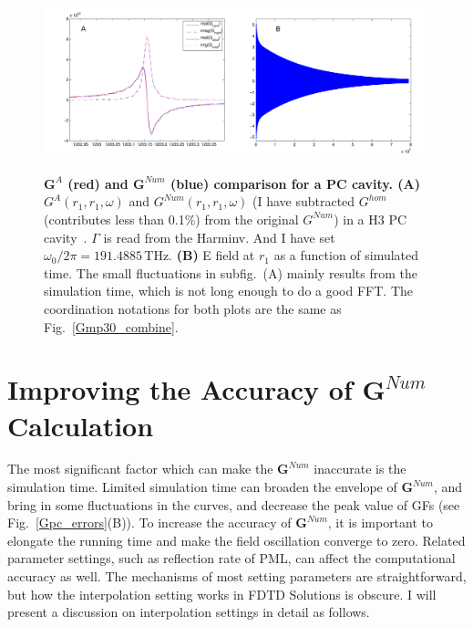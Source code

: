 \begin{figure}[H]
\centering
\begin{center}
{\includegraphics[width=16cm]{./Figs/G69_combine}}
\end{center}
\caption[GF for a PC cavity.]{\textbf{  $\mathbf{G}^{A}$ (red) and $\mathbf{G}^{Num}$ (blue) comparison for a PC cavity. (A)} $G^{A}(r_1,r_1,\omega)$ and $G^{Num}(r_1,r_1,\omega)$ (I have subtracted $G^{hom}$ (contributes less than 0.1\%) from the original $G^{Num}$) in a H3 PC cavity~\cite{Akahane2003}. $\Gamma$ is read from the Harminv. And I have set $\omega_0/2\pi=191.4885\,$THz. \textbf{(B)} E field at $r_1$ as a function of simulated time. The small fluctuations in subfig.~(A) mainly results from the simulation time, which is not long enough to do a good FFT. The coordination notations for both plots are the same as Fig.~\ref{Gmp30_combine}.}
\label{G69_combine}
\end{figure}




\section{Improving the Accuracy of $\mathbf{G}^{Num}$ Calculation}\label{section:homcheck}
The most significant factor which can make the $\mathbf{G}^{Num}$ inaccurate is the simulation time. Limited simulation time can broaden the envelope of $\mathbf{G}^{Num}$, and bring in some fluctuations in the curves, and decrease the peak value of GFs (see Fig.~\ref{Gpc_errors}(B)). To increase the accuracy of $\mathbf{G}^{Num}$, it is important to elongate the running time and make the field oscillation converge to zero. Related parameter settings, such as reflection rate of PML, can affect the computational accuracy as well. The mechanisms of most setting parameters are straightforward, but how the interpolation setting works in FDTD Solutions is obscure. I will present a discussion on interpolation settings in detail as follows.

